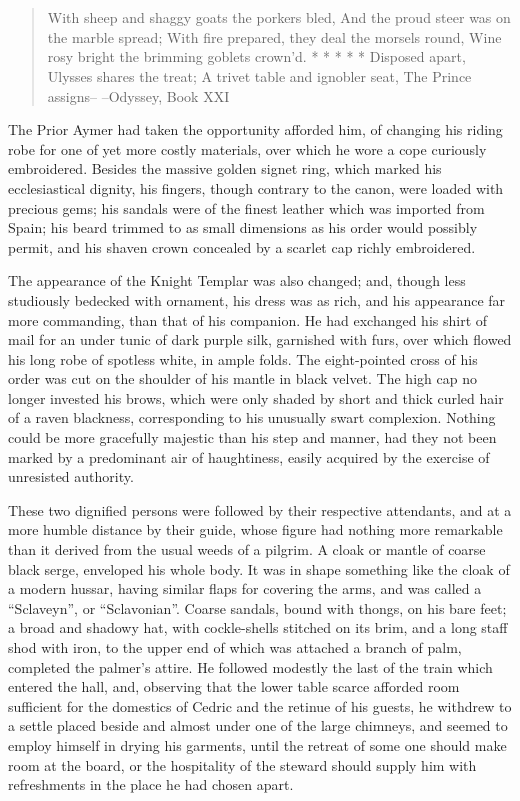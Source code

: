 \chapter{}

\begin{quote}
With sheep and shaggy goats the porkers bled,
And the proud steer was on the marble spread;
With fire prepared, they deal the morsels round,
Wine rosy bright the brimming goblets crown'd.
* * * * *
Disposed apart, Ulysses shares the treat;
A trivet table and ignobler seat,
The Prince assigns--
--Odyssey, Book XXI
\end{quote}

The Prior Aymer had taken the opportunity afforded him, of changing his
riding robe for one of yet more costly materials, over which he wore a
cope curiously embroidered. Besides the massive golden signet ring,
which marked his ecclesiastical dignity, his fingers, though contrary to
the canon, were loaded with precious gems; his sandals were of the
finest leather which was imported from Spain; his beard trimmed to as
small dimensions as his order would possibly permit, and his shaven
crown concealed by a scarlet cap richly embroidered.

The appearance of the Knight Templar was also changed; and, though less
studiously bedecked with ornament, his dress was as rich, and his
appearance far more commanding, than that of his companion. He had
exchanged his shirt of mail for an under tunic of dark purple silk,
garnished with furs, over which flowed his long robe of spotless white,
in ample folds. The eight-pointed cross of his order was cut on the
shoulder of his mantle in black velvet. The high cap no longer invested
his brows, which were only shaded by short and thick curled hair of a
raven blackness, corresponding to his unusually swart complexion.
Nothing could be more gracefully majestic than his step and manner, had
they not been marked by a predominant air of haughtiness, easily
acquired by the exercise of unresisted authority.

These two dignified persons were followed by their respective
attendants, and at a more humble distance by their guide, whose figure
had nothing more remarkable than it derived from the usual weeds of a
pilgrim. A cloak or mantle of coarse black serge, enveloped his whole
body. It was in shape something like the cloak of a modern hussar,
having similar flaps for covering the arms, and was called a
``Sclaveyn'', or ``Sclavonian''. Coarse sandals, bound with thongs, on
his bare feet; a broad and shadowy hat, with cockle-shells stitched on
its brim, and a long staff shod with iron, to the upper end of which was
attached a branch of palm, completed the palmer's attire. He followed
modestly the last of the train which entered the hall, and, observing
that the lower table scarce afforded room sufficient for the domestics
of Cedric and the retinue of his guests, he withdrew to a settle placed
beside and almost under one of the large chimneys, and seemed to employ
himself in drying his garments, until the retreat of some one should
make room at the board, or the hospitality of the steward should supply
him with refreshments in the place he had chosen apart.

